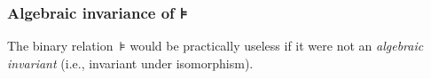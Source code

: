 \subsubsection{Algebraic invariance of ⊧}\label{algebraic-invariance-of}

The binary relation~\af ⊧ would be practically useless if it were not an \emph{algebraic invariant} (i.e., invariant under isomorphism).
\ccpad
\begin{code}%
\>[0]\AgdaSpace{}%
\AgdaModule{\AgdaUnderscore{}}\AgdaSpace{}%
\AgdaSymbol{\{}\AgdaSpace{}%
\AgdaSpace{}%
\AgdaSpace{}%
\AgdaSymbol{:}\AgdaSpace{}%
\AgdaSymbol{\}\{}\AgdaSpace{}%
\AgdaSymbol{:}\AgdaSpace{}%
\AgdaSpace{}%
\AgdaSymbol{\}}\AgdaSpace{}%
\<%
\\
%
\\[\AgdaEmptyExtraSkip]%
\>[0][@{}l@{\AgdaIndent{0}}]%
\>[1]\AgdaSpace{}%
\AgdaSymbol{:}%
\>[181I]\AgdaSymbol{\{}\AgdaSpace{}%
\AgdaSymbol{:}\AgdaSpace{}%
\AgdaSpace{}%
\AgdaSpace{}%
\AgdaSymbol{\}\{}\AgdaSpace{}%
\AgdaSymbol{:}\AgdaSpace{}%
\AgdaSpace{}%
\AgdaSpace{}%
\AgdaSymbol{\}}\<%
\\
\>[.][@{}l@{}]\<[181I]%
\>[18]\AgdaSymbol{(}\AgdaSpace{}%
\AgdaSpace{}%
\AgdaSymbol{:}\AgdaSpace{}%
\AgdaSpace{}%
\AgdaSymbol{)}%
\>[34]%
\>[37]\AgdaSpace{}%
\AgdaSpace{}%
\AgdaSpace{}%
\AgdaSpace{}%
%
\>[48]%
\>[51]\AgdaSpace{}%
\AgdaSpace{}%
%
\>[58]%
\>[61]\AgdaSpace{}%
\AgdaSpace{}%
\AgdaSpace{}%
\AgdaSpace{}%
\<%
\\
%
\\[\AgdaEmptyExtraSkip]%
%
\>[1]\AgdaSpace{}%
\AgdaSymbol{\{}\AgdaSymbol{\}\{}\AgdaSymbol{\}}\AgdaSpace{}%
\AgdaSpace{}%
\AgdaSpace{}%
\AgdaSpace{}%
\AgdaSymbol{(}\AgdaSpace{}%
\AgdaOperator{\AgdaInductiveConstructor{,}}\AgdaSpace{}%
\AgdaSpace{}%
\AgdaOperator{\AgdaInductiveConstructor{,}}\AgdaSpace{}%

\end{code}
